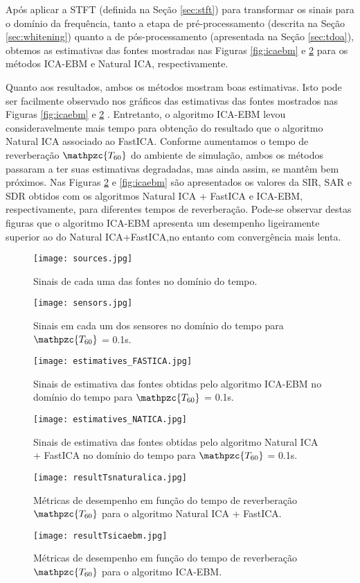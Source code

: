     Após aplicar a STFT (definida na Seção \ref{sec:stft}) para transformar os sinais para o domínio da frequência, tanto a etapa de pré-processamento (descrita na Seção \ref{sec:whitening}) quanto a de pós-processamento (apresentada na Seção \ref{sec:tdoa}), obtemos as estimativas das fontes mostradas nas Figuras \ref{fig:icaebm} e \ref{fig:natica} para os métodos ICA-EBM e Natural ICA, respectivamente.
    
    Quanto aos resultados, ambos os métodos mostram boas estimativas. Isto pode ser facilmente observado nos gráficos das estimativas das fontes mostrados nas Figuras \ref{fig:icaebm} e \ref{fig:natica} . Entretanto, o algoritmo ICA-EBM levou consideravelmente mais tempo para obtenção do resultado que o algoritmo Natural ICA associado ao FastICA. Conforme aumentamos o tempo de reverberação $\mathpzc{T_{60}}$ do ambiente de simulação, ambos os métodos passaram a ter suas estimativas degradadas, mas ainda assim, se mantêm bem próximos. Nas Figuras \ref{fig:natica} e \ref{fig:icaebm} são apresentados os valores da SIR, SAR e SDR obtidos com os algoritmos Natural ICA + FastICA e ICA-EBM, respectivamente, para diferentes tempos de reverberação. Pode-se observar destas figuras que o algoritmo ICA-EBM apresenta um desempenho ligeiramente superior ao do Natural ICA+FastICA,no entanto com convergência mais lenta.
    
    \begin{figure}
        \centering
        \texttt{[image: sources.jpg]}
            \caption{Sinais de cada uma das fontes no domínio do tempo.}
        \label{fig:sources}
        \texttt{[image: sensors.jpg]}
            \caption{Sinais em cada um dos sensores no domínio do tempo para $\mathpzc{T_{60}}$ = 0.1s.}
        \label{fig:sensors}
    \end{figure}
    
    \begin{figure}
        \centering
        \texttt{[image: estimatives\_FASTICA.jpg]}
        \caption{Sinais de estimativa das fontes obtidas pelo algoritmo ICA-EBM no domínio do tempo para $\mathpzc{T_{60}}$ = 0.1s.}
        \label{fig:icaebm}
        \texttt{[image: estimatives\_NATICA.jpg]}
        \caption{Sinais de estimativa das fontes obtidas pelo algoritmo Natural ICA + FastICA  no domínio do tempo para $\mathpzc{T_{60}}$ = 0.1s.}
        \label{fig:natica}
    \end{figure}
    
    
    \begin{figure}
        \centering
        \texttt{[image: resultTsnaturalica.jpg]}
        \caption{Métricas de desempenho em função do tempo de reverberação $\mathpzc{T_{60}}$ para o algoritmo Natural ICA + FastICA.}
        \label{fig:T60natica}
         \texttt{[image: resultTsicaebm.jpg]}
        \caption{Métricas de desempenho em função do tempo de reverberação $\mathpzc{T_{60}}$ para o algoritmo ICA-EBM.}
        \label{fig:T60icaebm}
    \end{figure}
    